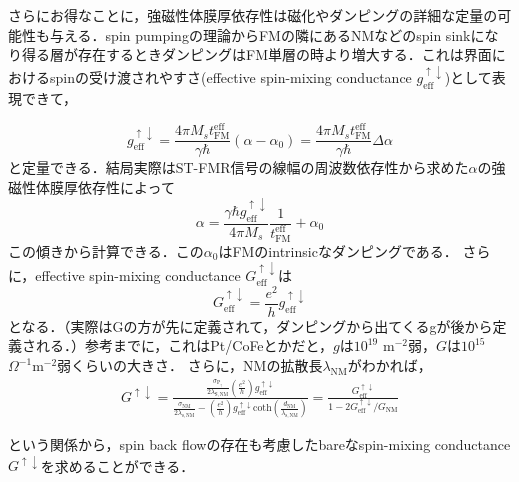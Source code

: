 \documentclass[11pt]{jbook}
\begin{document}
さらにお得なことに，強磁性体膜厚依存性は磁化やダンピングの詳細な定量の可能性も与える．spin pumpingの理論からFMの隣にあるNMなどのspin sinkになり得る層が存在するときダンピングはFM単層の時より増大する．これは界面におけるspinの受け渡されやすさ(effective spin-mixing conductance $g_{\mathrm{eff}}^{\uparrow \downarrow}$)として表現できて，

\begin{equation}
g_{\mathrm{eff}}^{\uparrow \downarrow}=\frac{4 \pi M_{s} t_{\mathrm{FM}}^{\mathrm{eff}}}{\gamma \hbar}\left(\alpha-\alpha_{0}\right)=\frac{4 \pi M_{s} t_{\mathrm{FM}}^{\mathrm{eff}}}{\gamma \hbar} \Delta \alpha
\end{equation}
と定量できる．結局実際はST-FMR信号の線幅の周波数依存性から求めた$\alpha$の強磁性体膜厚依存性によって
\begin{equation}
\alpha = \frac{\gamma \hbar g_{\mathrm{eff}}^{\uparrow \downarrow}}{4 \pi M_{s} }\frac{1}{t_{\mathrm{FM}}^{\mathrm{eff}}}+ \alpha_0
\end{equation}
この傾きから計算できる．この$\alpha_0$はFMのintrinsicなダンピングである．
さらに，effective spin-mixing conductance $G_{\mathrm{eff}}^{\uparrow \downarrow}$は
\begin{equation}
G_{\mathrm{eff}}^{\uparrow \downarrow}= \frac{e^2}{h}g_{\mathrm{eff}}^{\uparrow \downarrow}
\end{equation}
となる．（実際はGの方が先に定義されて，ダンピングから出てくるgが後から定義される．）参考までに，これはPt/CoFeとかだと，$g$は$10^{19}$ m$^{-2}$弱，$G$は$10^{15}$ $\Omega^{-1}$m$^{-2}$弱くらいの大きさ．
さらに，NMの拡散長$\lambda_\mathrm{NM}$がわかれば，
\begin{eqnarray}
G^{\uparrow \downarrow}=\frac{\frac{\sigma_{\mathrm{P}_{\uparrow}}}{2 \lambda_{\mathrm{S}, \mathrm{NM}}}\left(\frac{e^{2}}{h}\right) g_{\mathrm{eff}}^{\uparrow \downarrow}}{\frac{\sigma_{\mathrm{NM}}}{2 \lambda_{\mathrm{s}, \mathrm{NM}}}-\left(\frac{e^{2}}{h}\right) g_{\mathrm{eff}}^{\uparrow \downarrow} \mathrm{coth}\left(\frac{d_{\mathrm{NM}}}{\lambda_{\mathrm{s}, \mathrm{NM}}}\right)}=\frac{G_{\mathrm{eff}}^{\uparrow \downarrow}}{1-2 G_{\mathrm{eff}}^{\uparrow \downarrow} / G_{\mathrm{NM}}}
\end{eqnarray}

という関係から，spin back flowの存在も考慮したbareなspin-mixing conductance $G^{\uparrow \downarrow}$を求めることができる．
\end{document}
